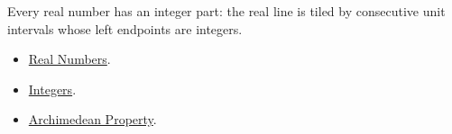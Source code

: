 \begin{remark*}[Interpretation]
Every real number has an integer part: the real line is tiled by consecutive
unit intervals whose left endpoints are integers.
\end{remark*}

\begin{dependencies}
\begin{itemize}
\item \hyperref[def:reals]{Real Numbers}.
\item \hyperref[def:integers]{Integers}.
\item \hyperref[thm:archimedean-property]{Archimedean Property}.
\end{itemize}
\end{dependencies}



